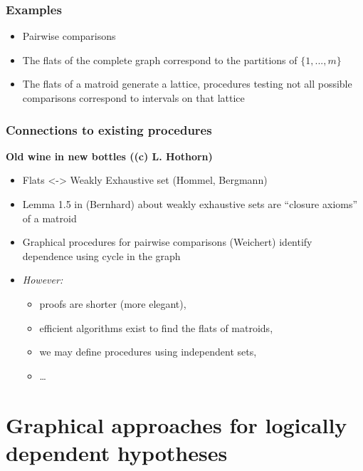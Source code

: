 \documentclass[bigger]{beamer}
\begin{document}
\begin{frame}
\frametitle{Examples}
\begin{itemize}

\item Pairwise comparisons

\item The flats of the complete graph correspond to the partitions of $\{1,...,m\}$

\item The flats of a matroid generate a lattice, procedures testing not all possible comparisons correspond to intervals on that lattice

\end{itemize} %
\end{frame}



\begin{frame}
\frametitle{Connections to existing procedures}

\textbf{Old wine in new bottles ((c) L. Hothorn)}
\begin{itemize}

\item Flats <-> Weakly Exhaustive set (Hommel, Bergmann)

\item Lemma 1.5 in (Bernhard) about weakly exhaustive sets are ``closure axioms'' of a matroid

\item Graphical procedures for pairwise comparisons (Weichert) identify dependence using cycle in the graph


\item \emph{However:}
\begin{itemize}
\item proofs are shorter (more elegant),
\item efficient algorithms exist to find the flats of matroids,
\item we may define procedures using independent sets,
\item \ldots{}
\end{itemize}

\end{itemize} %
\end{frame}
\section{Graphical approaches for logically dependent hypotheses}
\end{document}
